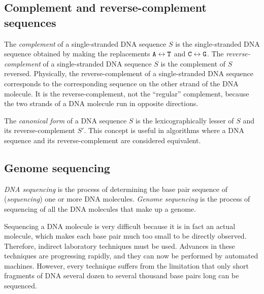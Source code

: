 \documentclass[12pt]{article}
\newcommand\Base[1]{{\tt #1}}
\newcommand{\KeyTerm}[1]{{\it #1}}
\begin{document}
\subsection{Complement and reverse-complement sequences}

The \KeyTerm{complement} of a single-stranded DNA sequence $S$ is the
single-stranded DNA sequence obtained by making the replacements $\Base{A}
\leftrightarrow \Base{T}$ and $\Base{C} \leftrightarrow \Base{G}$.  The
\KeyTerm{reverse-complement} of a single-stranded DNA sequence $S$ is the
complement of $S$ reversed.  Physically, the reverse-complement of a
single-stranded DNA sequence corresponds to the corresponding sequence on the
other strand of the DNA molecule.  It is the reverse-complement, not the
``regular'' complement, because the two strands of a DNA molecule run in
opposite directions.

The \KeyTerm{canonical form} of a DNA sequence $S$ is the lexicographically
lesser of $S$ and its reverse-complement $S'$.  This concept is useful in
algorithms where a DNA sequence and its reverse-complement are considered
equivalent.

\subsection{Genome sequencing}

\KeyTerm{DNA sequencing} is the process of determining the base pair sequence of
(\KeyTerm{sequencing}) one or more DNA molecules.  \KeyTerm{Genome sequencing}
is the process of sequencing of all the DNA molecules that make up a genome.

Sequencing a DNA molecule is very difficult because it is in fact an actual
molecule, which makes each base pair much too small to be directly observed.
Therefore, indirect laboratory techniques must be used.  Advances in these
techniques are progressing rapidly, and they can now be performed by automated
machines.  However, every technique suffers from the limitation that only short
fragments of DNA several dozen to several thousand base pairs long can be
sequenced.
\end{document}

